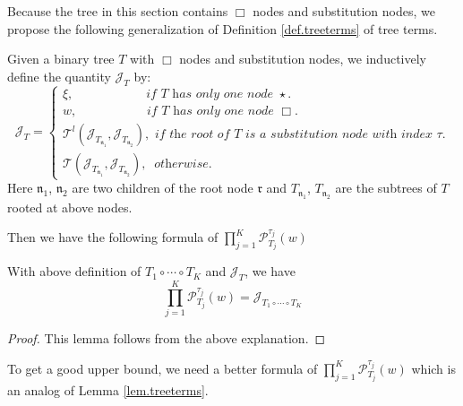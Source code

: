 Because the tree in this section contains $\Box$ nodes and substitution nodes, we propose the following generalization of Definition \ref{def.treeterms} of tree terms.

\begin{defn}\label{def.treetermsoperator} Given a binary tree $T$ with $\Box$ nodes and substitution nodes, we inductively define the quantity $\mathcal{J}_T$ by:
\begin{equation}\label{eq.treetermoperator.threewave}
    \mathcal{J}_T=
    \begin{cases}
    \xi, \qquad\qquad\quad\ \   \textit{ if $T$ has only one node $\star$.}
    \\
    w, \qquad\qquad\quad\ \textit{ if $T$ has only one node $\Box$.}
    \\
    \mathcal{T}^l(\mathcal{J}_{T_{\mathfrak{n}_1}}, \mathcal{J}_{T_{\mathfrak{n}_2}}), \textit{ if the root of $T$ is a substitution node with index $\tau$.}
    \\
    \mathcal{T}(\mathcal{J}_{T_{\mathfrak{n}_1}}, \mathcal{J}_{T_{\mathfrak{n}_2}}),\  \textit{ otherwise.}
    \end{cases}
\end{equation}
Here $\mathfrak{n}_1$, $\mathfrak{n}_2$ are two children of the root node $\mathfrak{r}$ and $T_{\mathfrak{n}_1}$, $T_{\mathfrak{n}_2}$ are the subtrees of $T$ rooted at above nodes.
\end{defn}

Then we have the following formula of $\prod_{j=1}^K\mathcal{P}^{\tau_j}_{T_j}(w)$

\begin{lem}
With above definition of $T_1\circ \cdots \circ T_{K}$ and $\mathcal{J}_T$, we have 
\begin{equation}\label{eq.operatoreqsimple.threewave}
    \prod_{j=1}^K\mathcal{P}^{\tau_j}_{T_j}(w)=\mathcal{J}_{T_1\circ \cdots \circ T_{K}}
\end{equation}
\end{lem}
\begin{proof}
This lemma follows from the above explanation.
\end{proof}

To get a good upper bound, we need a better formula of $\prod_{j=1}^K\mathcal{P}^{\tau_j}_{T_j}(w)$ which is an analog of Lemma \ref{lem.treeterms}. 

